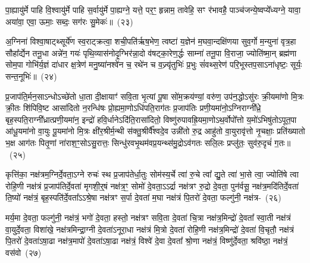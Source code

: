 पा॒ह्यायु॑र्मे पाहि वि॒श्वायु॑र्मे पाहि स॒र्वायु॑र्मे पा॒ह्यग्ने॒ यत्ते॒ पर॒ꣳ॒ हृन्नाम॒ तावेहि॒ सꣳ र॑भावहै॒ पाञ्च॑जन्ये॒ष्वप्ये᳚ध्यग्ने॒ यावा॒ अया॑वा॒ एवा॒ ऊमाः॒ सब्दः॒ सग॑रः सु॒मेकः॑॥~(२३)\ip

{\anuvakamend[{व्या॒नं मे॒ द्वात्रिꣳ॑शच्च}]}

अ॒ग्निना॑ विश्वा॒षाट्थ्सूर्ये॑ण स्व॒राट्क्रत्वा॒ शची॒पति॑र्\mbox{}ऋष॒भेण॒ त्वष्टा॑ य॒ज्ञेन॑ म॒घवा॒न्दक्षि॑णया सुव॒र्गो म॒न्युना॑ वृत्र॒हा सौहा᳚र्द्येन तनू॒धा अन्ने॑न॒ गयः॑ पृथि॒व्यास॑नोदृ॒ग्भिर॑न्ना॒दो व॑षट्का॒रेण॒र्द्धः साम्ना॑ तनू॒पा वि॒राजा॒ ज्योति॑ष्मा॒न् ब्रह्म॑णा सोम॒पा गोभि॑र्य॒ज्ञं दा॑धार क्ष॒त्रेण॑ मनु॒ष्या॑नश्वे॑न च॒ रथे॑न च व॒ज्र्यृ॑तुभिः॑ प्र॒भुः सं॑वथ्स॒रेण॑ परि॒भूस्तप॒सा\-ऽ\-ना॑धृष्टः॒ सूर्यः॒ सन्त॒नूभिः॑॥~(२४)\ip

{\anuvakamend[{अ॒ग्निनैका॒न्नप॑ञ्चा॒शत्}]}

प्र॒जा\-प॑ति॒र्मन॒सा\-ऽ\-न्धो\-ऽच्छे॑तो धा॒ता दी॒क्षायाꣳ॑ सवि॒ता भृ॒त्यां पू॒षा सो॑म॒क्रय॑ण्यां॒ वरु॑ण॒ उप॑न॒द्धो\-ऽसु॑रः क्री॒यमा॑णो मि॒त्रः क्री॒तः शि॑पिवि॒ष्ट आसा॑दितो न॒रन्धि॑षः प्रो॒ह्यमा॒णो\-ऽधि॑\-पति॒राग॑तः प्र॒जा\-प॑तिः प्रणी॒यमा॑नो॒\-ऽग्निराग्नी᳚ध्रे॒ बृह॒स्पति॒राग्नी᳚ध्रात्प्रणी॒यमा॑न॒ इन्द्रो॑ हवि॒र्धाने\-ऽदि॑ति॒रासा॑दितो॒ विष्णु॑रुपावह्रि॒यमा॒णो\-ऽथ॒र्वोपो᳚त्तो य॒मो॑\-ऽभिषु॑तो\-ऽपूत॒पा आ॑धू॒यमा॑नो वा॒युः पू॒यमा॑नो मि॒त्रः क्षी॑र॒श्रीर्म॒न्थी स॑क्तु॒श्रीर्वै᳚श्वदे॒व उन्नी॑तो रु॒द्र आहु॑तो वा॒युरावृ॑त्तो नृ॒चक्षाः॒ प्रति॑ख्यातो भ॒क्ष आग॑तः पितृ॒णां ना॑राश॒ꣳ॒सो\-ऽसु॒रात्तः॒ सिन्धु॑रवभृ॒थम॑वप्र॒यन्थ्स॑मु॒द्रो\-ऽव॑गतः सलि॒लः प्रप्लु॑तः॒ सुव॑रु॒दृचं॑ ग॒तः॥~(२५)\ip

{\anuvakamend[{रु॒द्र एक॑विꣳशतिश्च}]}

कृत्ति॑का॒ नक्ष॑त्रम॒ग्निर्दे॒वता॒ऽग्ने रुचः॑ स्थ प्र॒जा\-प॑तेर्धा॒तुः सोम॑स्य॒र्चे त्वा॑ रु॒चे त्वा᳚ द्यु॒ते त्वा॑ भा॒से त्वा॒ ज्योति॑षे त्वा रोहि॒णी नक्ष॑त्रं प्र॒जा\-प॑तिर्दे॒वता॑ मृगशी॒र्॒\mbox{}षं नक्ष॑त्र॒ꣳ॒ सोमो॑ दे॒वता॒ऽऽर्द्रा नक्ष॑त्रꣳ रु॒द्रो दे॒वता॒ पुन॑र्वसू॒ नक्ष॑त्र॒मदि॑ति\-र्दे॒वता॑ ति॒ष्यो॑ नक्ष॑त्रं॒ बृह॒स्पति॑र्दे॒वता᳚ऽऽश्रे॒षा नक्ष॑त्रꣳ स॒र्पा दे॒वता॑ म॒घा नक्ष॑त्रं पि॒तरो॑ दे॒वता॒ फल्गु॑नी॒ नक्ष॑त्र-~(२६)\ip

मर्य॒मा दे॒वता॒ फल्गु॑नी॒ नक्ष॑त्रं॒ भगो॑ दे॒वता॒ हस्तो॒ नक्ष॑त्रꣳ सवि॒ता दे॒वता॑ चि॒त्रा नक्ष॑त्र॒मिन्द्रो॑ दे॒वता᳚ स्वा॒ती नक्ष॑त्रं वा॒युर्दे॒वता॒ विशा॑खे॒ नक्ष॑त्रमिन्द्रा॒ग्नी दे॒वता॑\-ऽनूरा॒धा नक्ष॑त्रं मि॒त्रो दे॒वता॑ रोहि॒णी नक्ष॑त्र॒मिन्द्रो॑ दे॒वता॑ वि॒चृतौ॒ नक्ष॑त्रं पि॒तरो॑ दे॒वता॑ऽषा॒ढा नक्ष॑त्र॒मापो॑ दे॒वता॑ऽषा॒ढा नक्ष॑त्रं॒ विश्वे॑ दे॒वा दे॒वता᳚ श्रो॒णा नक्ष॑त्रं॒ विष्णु॑र्दे॒वता॒ श्रवि॑ष्ठा॒ नक्ष॑त्रं॒ वस॑वो~(२७)\ip

